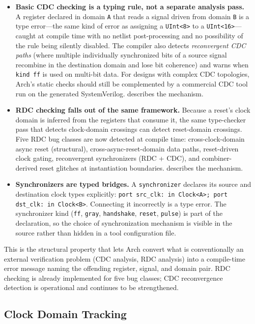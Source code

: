 \documentclass[11pt,twocolumn]{article}
\begin{document}
\begin{itemize}
\item \textbf{Basic CDC checking is a typing rule, not a separate analysis pass.} A register declared in domain \texttt{A} that reads a signal driven from domain \texttt{B} is a type error---the same kind of error as assigning a \texttt{UInt<8>} to a \texttt{UInt<16>}---caught at compile time with no netlist post-processing and no possibility of the rule being silently disabled. The compiler also detects \emph{reconvergent CDC paths} (where multiple individually synchronized bits of a source signal recombine in the destination domain and lose bit coherence) and warns when \texttt{kind ff} is used on multi-bit data. For designs with complex CDC topologies, Arch's static checks should still be complemented by a commercial CDC tool run on the generated SystemVerilog.  describes the mechanism.
\item \textbf{RDC checking falls out of the same framework.} Because a reset's clock domain is inferred from the registers that consume it, the same type-checker pass that detects clock-domain crossings can detect reset-domain crossings. Five RDC bug classes are now detected at compile time: cross-clock-domain async reset (structural), cross-async-reset-domain data paths, reset-driven clock gating, reconvergent synchronizers (RDC + CDC), and combiner-derived reset glitches at instantiation boundaries.  describes the mechanism.
\item \textbf{Synchronizers are typed bridges.} A \texttt{synchronizer} declares its source and destination clock types explicitly: \texttt{port src\_clk: in Clock<A>; port dst\_clk: in Clock<B>}. Connecting it incorrectly is a type error. The synchronizer kind (\texttt{ff}, \texttt{gray}, \texttt{handshake}, \texttt{reset}, \texttt{pulse}) is part of the declaration, so the choice of synchronization mechanism is visible in the source rather than hidden in a tool configuration file.
\end{itemize}

This is the structural property that lets Arch convert what is conventionally an external verification problem (CDC analysis, RDC analysis) into a compile-time error message naming the offending register, signal, and domain pair. RDC checking is already implemented for five bug classes; CDC reconvergence detection is operational and continues to be strengthened.

\subsection{Clock Domain Tracking}
\label{sec:cdc}
\end{document}
